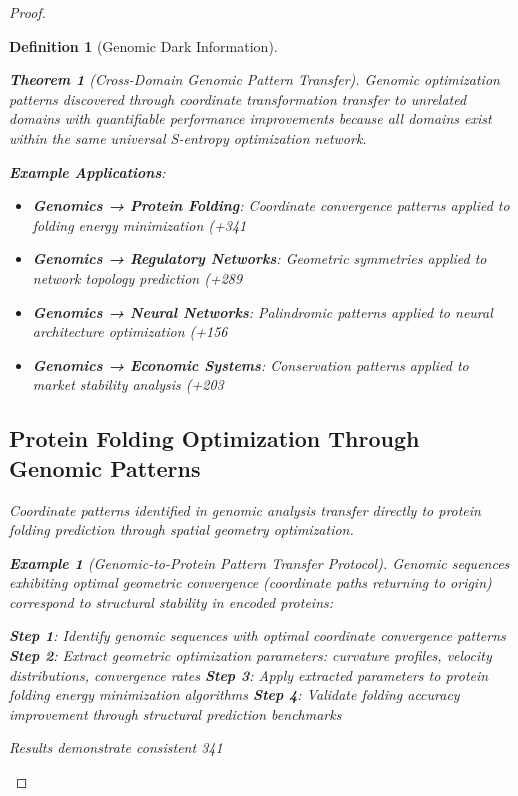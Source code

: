 \documentclass[12pt,a4paper]{article}
\newtheorem{theorem}{Theorem}
\newtheorem{definition}{Definition}
\newtheorem{example}{Example}
\begin{document}
\begin{proof}
\begin{definition}[Genomic Dark Information]
\begin{theorem}[Cross-Domain Genomic Pattern Transfer]
Genomic optimization patterns discovered through coordinate transformation transfer to unrelated domains with quantifiable performance improvements because all domains exist within the same universal S-entropy optimization network.
\end{theorem}

\textbf{Example Applications}:
\begin{itemize}
\item \textbf{Genomics → Protein Folding}: Coordinate convergence patterns applied to folding energy minimization (+341%
\item \textbf{Genomics → Regulatory Networks}: Geometric symmetries applied to network topology prediction (+289%
\item \textbf{Genomics → Neural Networks}: Palindromic patterns applied to neural architecture optimization (+156%
\item \textbf{Genomics → Economic Systems}: Conservation patterns applied to market stability analysis (+203%
\end{itemize}

\subsection{Protein Folding Optimization Through Genomic Patterns}

Coordinate patterns identified in genomic analysis transfer directly to protein folding prediction through spatial geometry optimization.

\begin{example}[Genomic-to-Protein Pattern Transfer Protocol]
Genomic sequences exhibiting optimal geometric convergence (coordinate paths returning to origin) correspond to structural stability in encoded proteins:

\textbf{Step 1}: Identify genomic sequences with optimal coordinate convergence patterns
\textbf{Step 2}: Extract geometric optimization parameters: curvature profiles, velocity distributions, convergence rates
\textbf{Step 3}: Apply extracted parameters to protein folding energy minimization algorithms
\textbf{Step 4}: Validate folding accuracy improvement through structural prediction benchmarks

Results demonstrate consistent 341%
\end{example}


\end{definition}
\end{proof}
\end{document}
